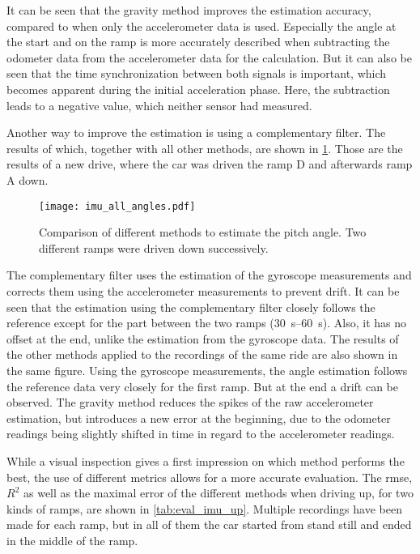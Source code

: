 It can be seen that the gravity method improves the estimation accuracy, compared to when only the accelerometer data is used.
Especially the angle at the start and on the ramp is more accurately described when subtracting the odometer data from the accelerometer data for the calculation.
But it can also be seen that the time synchronization between both signals is important, which becomes apparent during the initial acceleration phase.
Here, the subtraction leads to a negative value, which neither sensor had measured.\par
Another way to improve the estimation is using a complementary filter.
The results of which, together with all other methods, are shown in \cref{fig:imu_all_angles}.
Those are the results of a new drive, where the car was driven the ramp D and afterwards ramp A down.
\begin{figure}[htb]
    \centering
    \texttt{[image: imu\_all\_angles.pdf]}
    \caption[Angle estimation comparison of all methods]{Comparison of different methods to estimate the pitch angle. Two different ramps were driven down successively.}
    \label{fig:imu_all_angles}
\end{figure}
The complementary filter uses the estimation of the gyroscope measurements and corrects them using the accelerometer measurements to prevent drift.
It can be seen that the estimation using the complementary filter closely follows the reference except for the part between the two ramps (\SIrange{30}{60}{\second}).
Also, it has no offset at the end, unlike the estimation from the gyroscope data.
The results of the other methods applied to the recordings of the same ride are also shown in the same figure.
Using the gyroscope measurements, the angle estimation follows the reference data very closely for the first ramp.
But at the end a drift can be observed.
The gravity method reduces the spikes of the raw accelerometer estimation, but introduces a new error at the beginning, due to the odometer readings being slightly shifted in time in regard to the accelerometer readings.\par
While a visual inspection gives a first impression on which method performs the best, the use of different metrics allows for a more accurate evaluation.
The \gls{rmse}, $R^2$ as well as the maximal error of the different methods when driving up, for two kinds of ramps, are shown in \cref{tab:eval_imu_up}.
Multiple recordings have been made for each ramp, but in all of them the car started from stand still and ended in the middle of the ramp.
